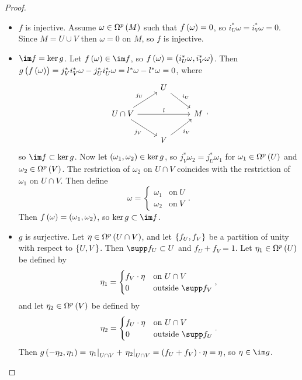 \begin{proof}
\hfill
\begin{itemize}
\item $ f $ is injective. Assume $ \omega \in \Omega^p\br{M} $ such that $ f\br{\omega} = 0 $, so $ i_U^*\omega = i_V^*\omega = 0 $. Since $ M = U \cup V $ then $ \omega = 0 $ on $ M $, so $ f $ is injective.
\item $ \im f = \ker g $. Let $ f\br{\omega} \in \im f $, so $ f\br{\omega} = \br{i_U^*\omega, i_V^*\omega} $. Then $ g\br{f\br{\omega}} = j_V^*i_V^*\omega - j_U^*i_U^*\omega = l^*\omega - l^*\omega = 0 $, where
$$
\begin{tikzcd}
& U \arrow{dr}{i_U} & \\
U \cap V \arrow{ur}{j_U} \arrow{rr}{l} \arrow{dr}[swap]{j_V} & & M \\
& V \arrow{ur}[swap]{i_V} &
\end{tikzcd},
$$
so $ \im f \subset \ker g $. Now let $ \br{\omega_1, \omega_2} \in \ker g $, so $ j_V^*\omega_2 = j_U^*\omega_1 $ for $ \omega_1 \in \Omega^p\br{U} $ and $ \omega_2 \in \Omega^p\br{V} $. The restriction of $ \omega_2 $ on $ U \cap V $ coincides with the restriction of $ \omega_1 $ on $ U \cap V $. Then define
$$ \omega =
\begin{cases}
\omega_1 & \text{on} \ U \\
\omega_2 & \text{on} \ V
\end{cases}.
$$
Then $ f\br{\omega} = \br{\omega_1, \omega_2} $, so $ \ker g \subset \im f $.
\item $ g $ is surjective. Let $ \eta \in \Omega^p\br{U \cap V} $, and let $ \cbr{f_U, f_V} $ be a partition of unity with respect to $ \cbr{U, V} $. Then $ \supp f_U \subset U $ and $ f_U + f_V = 1 $. Let $ \eta_1 \in \Omega^p\br{U} $ be defined by
$$ \eta_1 =
\begin{cases}
f_V \cdot \eta & \text{on} \ U \cap V \\
0 & \text{outside} \ \supp f_V
\end{cases},
$$
and let $ \eta_2 \in \Omega^p\br{V} $ be defined by
$$ \eta_2 =
\begin{cases}
f_U \cdot \eta & \text{on} \ U \cap V \\
0 & \text{outside} \ \supp f_U
\end{cases}.
$$
Then $ g\br{-\eta_2, \eta_1} = \eval{\eta_1}_{U \cap V} + \eval{\eta_2}_{U \cap V} = \br{f_U + f_V} \cdot \eta = \eta $, so $ \eta \in \im g $.
\end{itemize}
\end{proof}

